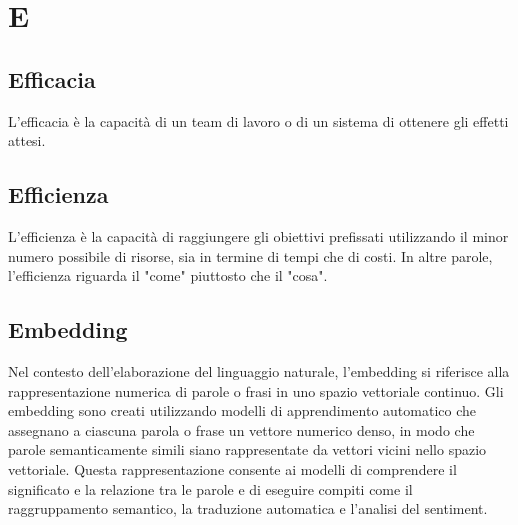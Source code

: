 \section{E}

\vspace{2em}
\subsection*{Efficacia}
\par L'efficacia è la capacità di un team di lavoro o di un sistema di ottenere gli effetti attesi.

\vspace{2em}
\subsection*{Efficienza}
\par L'efficienza è la capacità di raggiungere gli obiettivi prefissati utilizzando il minor numero possibile di risorse, sia in termine di tempi che di costi. In altre parole, l'efficienza riguarda il "come" piuttosto che il "cosa".

\vspace{2em}
\subsection*{Embedding}
\par Nel contesto dell'elaborazione del linguaggio naturale, l'embedding si riferisce alla rappresentazione numerica di parole o frasi in uno spazio vettoriale continuo. Gli embedding sono creati utilizzando modelli di apprendimento automatico che assegnano a ciascuna parola o frase un vettore numerico denso, in modo che parole semanticamente simili siano rappresentate da vettori vicini nello spazio vettoriale. Questa rappresentazione consente ai modelli di comprendere il significato e la relazione tra le parole e di eseguire compiti come il raggruppamento semantico, la traduzione automatica e l'analisi del sentiment.
